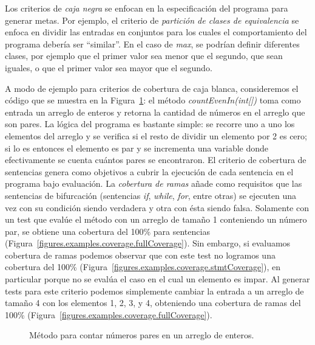 Los criterios de \emph{caja negra} se enfocan en la especificaci\'on del programa para generar metas. Por ejemplo, el criterio de \emph{partici\'on de clases de equivalencia} se enfoca en dividir las entradas en conjuntos para los cuales el comportamiento del programa deber\'ia ser ``similar''. En el caso de \emph{max}, se podr\'ian definir diferentes clases, por ejemplo que el primer valor sea menor que el segundo, que sean iguales, o que el primer valor sea mayor que el segundo. 

A modo de ejemplo para criterios de cobertura de caja blanca, consideremos el c\'odigo que se muestra en la Figura~\ref{figures.code.coverageExample}: el m\'etodo \emph{countEvenIn(int[])} toma como entrada un arreglo de enteros y retorna la cantidad de n\'umeros en el arreglo que son pares. La l\'ogica del programa es bastante simple: se recorre uno a uno los elementos del arreglo y se verifica si el resto de dividir un elemento por 2 es cero; si lo es entonces el elemento es par y se incrementa una variable donde efectivamente se cuenta cu\'antos pares se encontraron. El criterio de cobertura de sentencias genera como objetivos a cubrir la ejecuci\'on de cada sentencia en el programa bajo evaluaci\'on. La \emph{cobertura de ramas} a\~nade como requisitos que las sentencias de bifurcaci\'on (sentencias \emph{if}, \emph{while}, \emph{for}, entre otras) se ejecuten una vez con su condici\'on siendo verdadera y otra con \'esta siendo falsa. Solamente con un test que eval\'ue el m\'etodo con un arreglo de tama\~no 1 conteniendo un n\'umero par, se obtiene una cobertura del 100\% para sentencias (Figura~\ref{figures.examples.coverage.fullCoverage}). Sin embargo, si evaluamos cobertura de ramas podemos observar que con este test no logramos una cobertura del 100\% (Figura~\ref{figures.examples.coverage.stmtCoverage}), en particular porque no se eval\'ua el caso en el cual un elemento es impar. Al generar tests para este criterio podemos simplemente cambiar la entrada a un arreglo de tama\~no 4 con los elementos 1, 2, 3, y 4, obteniendo una cobertura de ramas del 100\% (Figura~\ref{figures.examples.coverage.fullCoverage}).

\begin{figure}
	
	\caption[M\'etodo \emph{countEvenIn(int[])}]{M\'etodo para contar n\'umeros pares en un arreglo de enteros.}
	\label{figures.code.coverageExample}
\end{figure}

